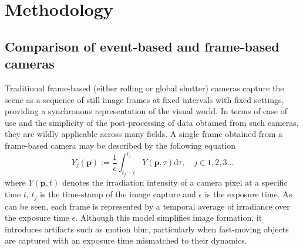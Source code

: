
\chapter{Methodology\label{chap:methodology}}

\section{Comparison of event-based and frame-based cameras}

Traditional frame-based (either rolling or global shutter) cameras capture the scene as a sequence of still image frames at fixed intervals with fixed settings, providing a synchronous representation of the visual world. 
In terms of ease of use and the simplicity of the post-processing of data obtained from such cameras, they are wildly applicable across many fields.
A single frame obtained from a frame-based camera may be described by the following equation ~\cite{scheerlinck2018event}
\begin{equation}
Y_j(\boldsymbol{p}) := \frac{1}{\epsilon} \int_{t_j - \epsilon}^{t_j} Y(\boldsymbol{p}, \tau) \mathrm{d} \tau, \quad j \in 1, 2, 3 ...
\label{eq:frame}
\end{equation}
where $Y(\boldsymbol{p}, t)$ denotes the irradiation intensity of a camera pixel at a specific time $t$, $t_j$ is the time-stamp of the image capture and $\epsilon$ is the exposure time.
As can be seen, each frame is represented by a temporal average of irradiance over the exposure time $\epsilon$. Although this model simplifies image formation, it introduces artifacts such as motion blur, particularly when fast-moving objects are captured with an exposure time mismatched to their dynamics.

